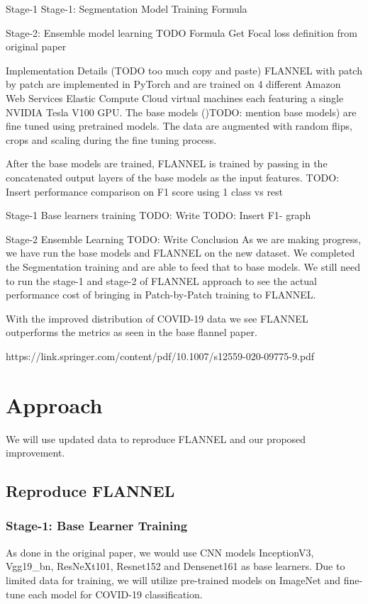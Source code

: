 \documentclass{sigkddExp}
\begin{document}
Stage-1
Stage-1: Segmentation Model Training
Formula



Stage-2: Ensemble model learning
TODO Formula
Get Focal loss definition from original paper


Implementation Details
(TODO too much copy and paste)
FLANNEL with patch by patch are implemented in PyTorch and are trained on 4 different Amazon Web Services Elastic Compute Cloud virtual machines each featuring a single NVIDIA Tesla V100 GPU. The base models ()TODO: mention base models) are fine tuned using pretrained models. The data are augmented with random flips, crops and scaling during the fine tuning process.

After the base models are trained, FLANNEL is trained by passing in the concatenated output layers of the base models as the input features.
TODO: Insert performance comparison on F1 score using 1 class vs rest

Stage-1 Base learners training
TODO: Write
TODO: Insert F1- graph


Stage-2 Ensemble Learning
TODO: Write
Conclusion
As we are making progress, we have run the base models and FLANNEL on the new dataset. We completed the Segmentation training and are able to feed that to base models. We still need to run the stage-1 and stage-2 of FLANNEL approach to see the actual performance cost of bringing in Patch-by-Patch training to FLANNEL.

With the improved distribution of COVID-19 data we see FLANNEL outperforms the metrics as seen in the base flannel paper.

https://link.springer.com/content/pdf/10.1007/s12559-020-09775-9.pdf


\section{Approach}

We will use updated data to reproduce FLANNEL and our proposed improvement.

\subsection{Reproduce FLANNEL}
\subsubsection{Stage-1: Base Learner Training}
As done in the original paper, we would use CNN models InceptionV3, Vgg19\_bn,
ResNeXt101, Resnet152 and Densenet161 as base learners. Due to limited data for
training, we will utilize pre-trained models on ImageNet and fine-tune each
model for COVID-19 classification.
\end{document}
